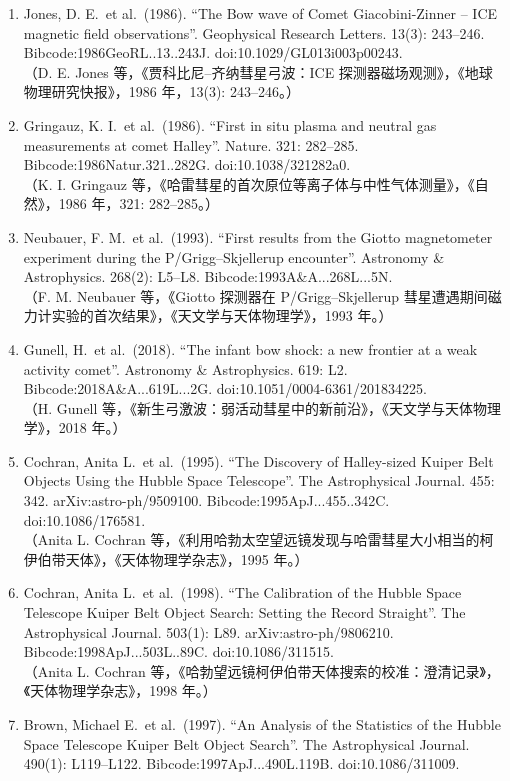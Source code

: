 \begin{enumerate}
（C. M. Lisse 等，《由电荷交换引起的 C/1999 S4（LINEAR）彗星 X 射线辐射》，《科学》，2001 年，292(5520): 1343–1348。）
\item Jones, D. E.\ et al.\ (1986). “The Bow wave of Comet Giacobini-Zinner – ICE magnetic field observations”. Geophysical Research Letters. 13(3): 243–246. Bibcode:1986GeoRL..13..243J. doi:10.1029/GL013i003p00243.\\
（D. E. Jones 等，《贾科比尼–齐纳彗星弓波：ICE 探测器磁场观测》，《地球物理研究快报》，1986 年，13(3): 243–246。）
\item Gringauz, K. I.\ et al.\ (1986). “First in situ plasma and neutral gas measurements at comet Halley”. Nature. 321: 282–285. Bibcode:1986Natur.321..282G. doi:10.1038/321282a0.\\
（K. I. Gringauz 等，《哈雷彗星的首次原位等离子体与中性气体测量》，《自然》，1986 年，321: 282–285。）
\item Neubauer, F. M.\ et al.\ (1993). “First results from the Giotto magnetometer experiment during the P/Grigg–Skjellerup encounter”. Astronomy \& Astrophysics. 268(2): L5–L8. Bibcode:1993A\&A...268L...5N.\\
（F. M. Neubauer 等，《Giotto 探测器在 P/Grigg–Skjellerup 彗星遭遇期间磁力计实验的首次结果》，《天文学与天体物理学》，1993 年。）
\item Gunell, H.\ et al.\ (2018). “The infant bow shock: a new frontier at a weak activity comet”. Astronomy \& Astrophysics. 619: L2. Bibcode:2018A\&A...619L...2G. doi:10.1051/0004-6361/201834225.\\
（H. Gunell 等，《新生弓激波：弱活动彗星中的新前沿》，《天文学与天体物理学》，2018 年。）
\item Cochran, Anita L.\ et al.\ (1995). “The Discovery of Halley-sized Kuiper Belt Objects Using the Hubble Space Telescope”. The Astrophysical Journal. 455: 342. arXiv:astro-ph/9509100. Bibcode:1995ApJ...455..342C. doi:10.1086/176581.\\
（Anita L. Cochran 等，《利用哈勃太空望远镜发现与哈雷彗星大小相当的柯伊伯带天体》，《天体物理学杂志》，1995 年。）
\item Cochran, Anita L.\ et al.\ (1998). “The Calibration of the Hubble Space Telescope Kuiper Belt Object Search: Setting the Record Straight”. The Astrophysical Journal. 503(1): L89. arXiv:astro-ph/9806210. Bibcode:1998ApJ...503L..89C. doi:10.1086/311515.\\
（Anita L. Cochran 等，《哈勃望远镜柯伊伯带天体搜索的校准：澄清记录》，《天体物理学杂志》，1998 年。）
\item Brown, Michael E.\ et al.\ (1997). “An Analysis of the Statistics of the Hubble Space Telescope Kuiper Belt Object Search”. The Astrophysical Journal. 490(1): L119–L122. Bibcode:1997ApJ...490L.119B. doi:10.1086/311009.

\end{enumerate}
